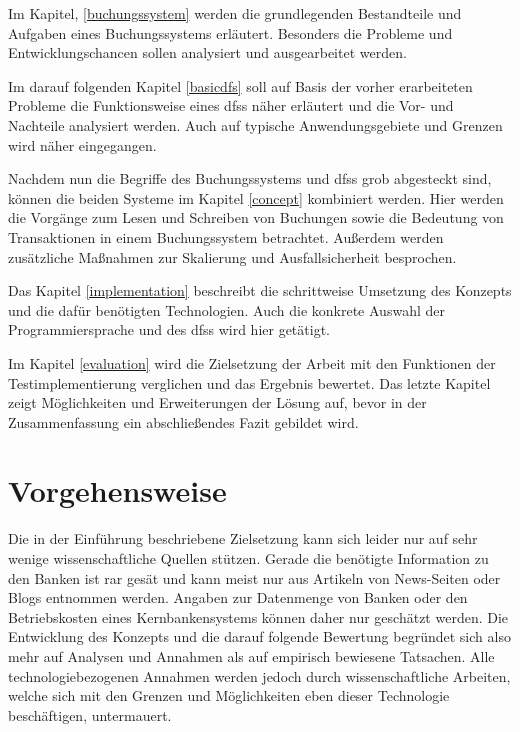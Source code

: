 \documentclass[12pt,oneside,a4paper,parskip]{scrbook}
\newcommand\blankpage{%
    \null
    \thispagestyle{empty}%
    \newpage}
\begin{document}
Im Kapitel, \ref{buchungssystem} werden die grundlegenden Bestandteile und Aufgaben eines Buchungssystems erläutert. Besonders die Probleme und Entwicklungschancen sollen analysiert und ausgearbeitet werden.

Im darauf folgenden Kapitel \ref{basicdfs} soll auf Basis der vorher erarbeiteten Probleme die Funktionsweise eines \acp{dfs} näher erläutert und die Vor- und Nachteile analysiert werden. Auch auf typische Anwendungsgebiete und Grenzen wird näher eingegangen.

Nachdem nun die Begriffe des Buchungssystems und \acp{dfs} grob abgesteckt sind, können die beiden Systeme im Kapitel \ref{concept} kombiniert werden. Hier werden die Vorgänge zum Lesen und Schreiben von Buchungen sowie die Bedeutung von Transaktionen in einem Buchungssystem betrachtet. Außerdem werden zusätzliche Maßnahmen zur Skalierung und Ausfallsicherheit besprochen.

Das Kapitel \ref{implementation} beschreibt die schrittweise Umsetzung des Konzepts und die dafür benötigten Technologien. Auch die konkrete Auswahl der Programmiersprache und des \acp{dfs} wird hier getätigt.

Im Kapitel \ref{evaluation} wird die Zielsetzung der Arbeit mit den Funktionen der Testimplementierung verglichen und das Ergebnis bewertet. Das letzte Kapitel zeigt Möglichkeiten und Erweiterungen der Lösung auf, bevor in der Zusammenfassung ein abschließendes Fazit gebildet wird.

\afterpage{\blankpage}
\chapter{Vorgehensweise}
Die in der Einführung beschriebene Zielsetzung kann sich leider nur auf sehr wenige wissenschaftliche Quellen stützen. Gerade die benötigte Information zu den Banken ist rar gesät und kann meist nur aus Artikeln von News-Seiten oder Blogs entnommen werden. Angaben zur Datenmenge von Banken oder den Betriebskosten eines Kernbankensystems können daher nur geschätzt werden. Die Entwicklung des Konzepts und die darauf folgende Bewertung begründet sich also mehr auf Analysen und Annahmen als auf empirisch bewiesene Tatsachen. Alle technologiebezogenen Annahmen werden jedoch durch wissenschaftliche Arbeiten, welche sich mit den Grenzen und Möglichkeiten eben dieser Technologie beschäftigen, untermauert.
\end{document}
